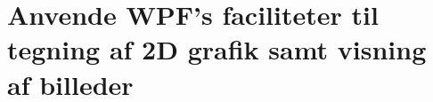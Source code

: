 \section{Anvende WPF's faciliteter til tegning af 2D grafik samt visning af billeder}\label{sec:spm4}

